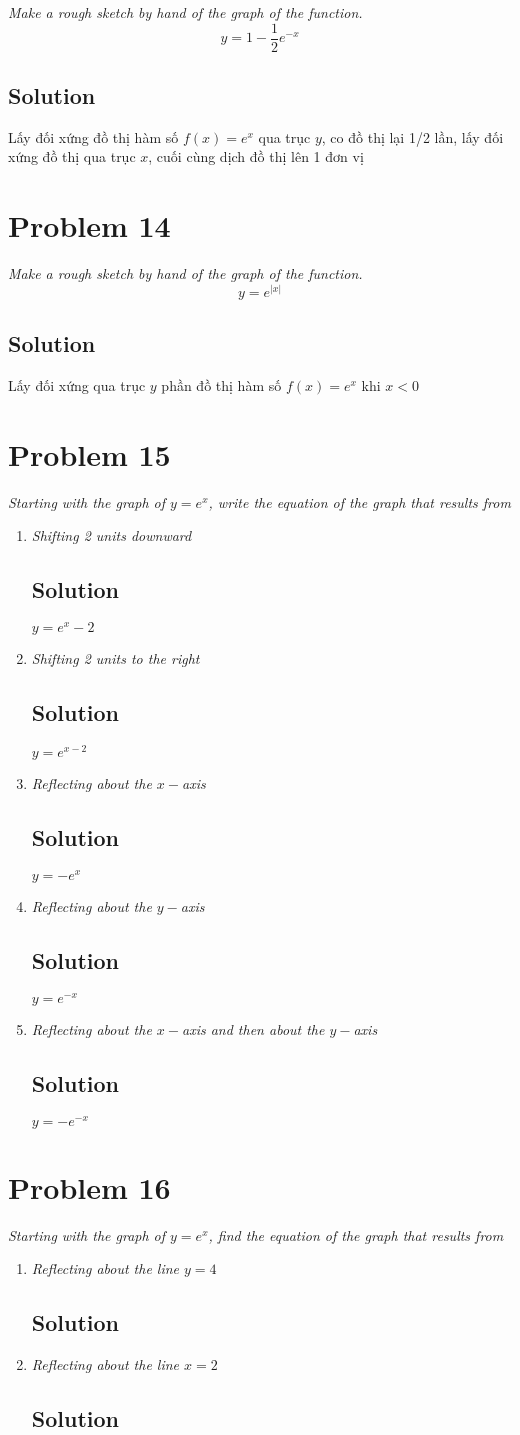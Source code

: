 \documentclass[11pt]{article}
\newcommand{\soln}{\subsection*}
\newcommand{\qn}{\textit}
\begin{document}
\qn{Make a rough sketch by hand of the graph of the function. $$y=1-\frac{1}{2}e^{-x}$$}

\soln{Solution}
Lấy đối xứng đồ thị hàm số $f(x)=e^x$ qua trục $y$, co đồ thị lại 1/2 lần, lấy đối xứng đồ thị qua trục $x$, cuối cùng dịch đồ thị lên 1 đơn vị

\section*{Problem 14}

\qn{Make a rough sketch by hand of the graph of the function. $$y=e^{|x|}$$}

\soln{Solution}
Lấy đối xứng qua trục $y$ phần đồ thị hàm số $f(x)=e^x$ khi $x<0$

\section*{Problem 15}

\qn{Starting with the graph of $y=e^x$, write the equation of the graph that results from}

\begin{enumerate}
	\item \qn{Shifting 2 units downward}
	\soln{Solution}
	$y=e^x-2$
	
	\item \qn{Shifting 2 units to the right}
	\soln{Solution}
	$y=e^{x-2}$
	
	\item \qn{Reflecting about the $x-$axis}
	\soln{Solution}
	$y=-e^x$
	
	\item \qn{Reflecting about the $y-$axis}
	\soln{Solution}
	$y=e^{-x}$
	
	\item \qn{Reflecting about the $x-$axis and then about the $y-$axis}
	\soln{Solution}
	$y=-e^{-x}$
\end{enumerate}

\section*{Problem 16}

\qn{Starting with the graph of $y=e^x$, find the equation of the graph that results from}

\begin{enumerate}
	\item \qn{Reflecting about the line $y=4$}
	\soln{Solution}
	
	\item \qn{Reflecting about the line $x=2$}
	\soln{Solution}
\end{enumerate}
\end{document}
